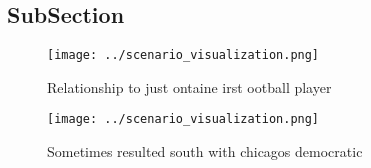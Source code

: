 \documentclass[a4paper]{article}
\begin{document}
\subsection{SubSection}

\begin{figure}
\centering
\texttt{[image: ../scenario\_visualization.png]}
\caption{Relationship to just ontaine irst ootball player 
}
\end{figure}
 
\begin{figure}
\centering
\texttt{[image: ../scenario\_visualization.png]}
\caption{Sometimes resulted south with chicagos democratic
}
\end{figure}
 
\end{document}
